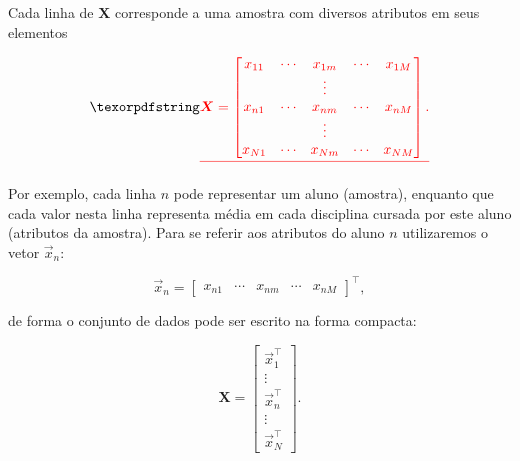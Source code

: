     \DIFaddend Cada linha de $\boldsymbol{X}$ corresponde a uma amostra com diversos atributos em seus elementos\DIFdelbegin \DIFdel{:
}%

\begin{displaymath} \DIFdel{%
      \boldsymbol{X} = \begin{bmatrix}
        x_{11} & \cdots & x_{1m} & \cdots & x_{1M} \\
               & & \vdots & &       \\
        x_{n1} & \cdots & x_{nm} & \cdots & x_{nM} \\
               & & \vdots & &       \\
        x_{N1} & \cdots & x_{Nm} & \cdots & x_{NM} \\
      \end{bmatrix}
      .
    }\end{displaymath}%

\DIFdelend \DIFaddbegin {}\DIFaddend Por exemplo, cada linha $n$ pode representar um aluno (amostra), enquanto que cada valor nesta linha representa média em cada disciplina cursada por este aluno (atributos da amostra). Para se referir aos atributos do aluno $n$ utilizaremos o vetor $\vec{x}_n$:

    \begin{equation} \label{e:x_n}
      \vec{x}_n = \begin{bmatrix} x_{n1} & \cdots & x_{nm} & \cdots & x_{nM} \end{bmatrix}^{\top}
      ,
    \end{equation}

    \noindent de forma \DIFaddbegin {}\DIFaddend o conjunto de dados \DIFdelbegin {}\DIFdelend \DIFaddbegin {}\DIFaddend pode ser escrito na forma compacta:

    \begin{equation} \label{e:X_compacta}
      \boldsymbol{X} = \begin{bmatrix}
        \vec{x}_1^{\top} \\
        \vdots \\
        \vec{x}_n^{\top} \\
        \vdots \\
        \vec{x}_N^{\top}
      \end{bmatrix}
      .
    \end{equation}

